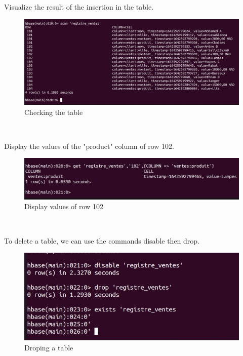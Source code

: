 \begin{spacing}{1.2}
\par Visualize the result of the insertion in the table.
\\
\begin{figure}[!htb] 
\begin{center} 
\includegraphics[width=1\linewidth]{Pictures/HBase/Manipulation of HBase/Creation of a BD/Checking the table} 
\end{center} 
\caption{Checking the table} 
\end{figure}  \FloatBarrier
\\
\newpage
\par Display the values of the "product" column of row 102.
\\
\begin{figure}[!htb] 
\begin{center} 
\includegraphics[width=1\linewidth]{Pictures/HBase/Manipulation of HBase/Creation of a BD/Display values of row 102} 
\end{center} 
\caption{Display values of row 102} 
\end{figure}  \FloatBarrier
\\

\par To delete a table, we can use the commands disable then drop.
\\
\begin{figure}[!htb] 
\begin{center} 
\includegraphics[width=1\linewidth]{Pictures/HBase/Manipulation of HBase/Creation of a BD/Droping a table} 
\end{center} 
\caption{Droping a table} 
\end{figure}  \FloatBarrier
\\

\end{spacing}